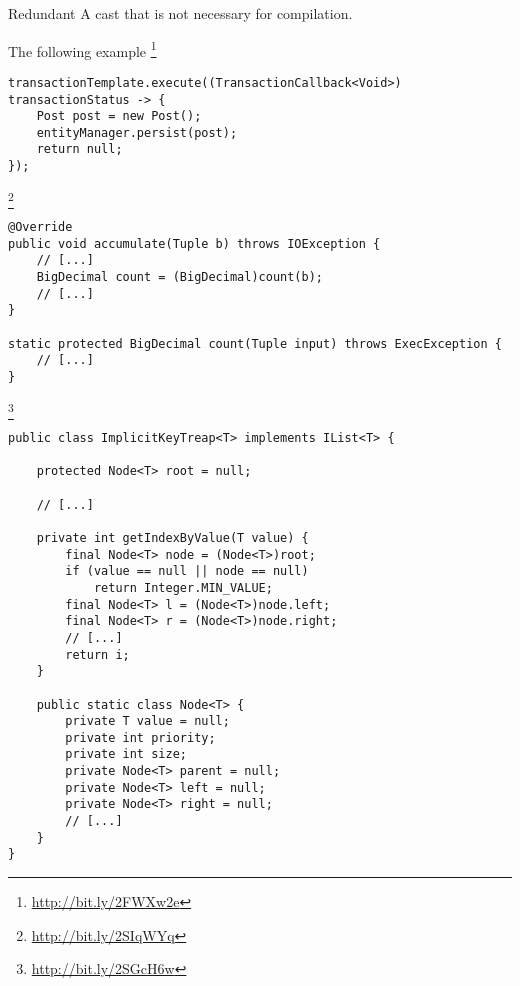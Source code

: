 \begin{pattern}{Redundant}
A cast that is not necessary for compilation.

\instances{}
The following example%
\footnote{\url{http://bit.ly/2FWXw2e}}

\begin{verbatim}
transactionTemplate.execute((TransactionCallback<Void>) transactionStatus -> {
    Post post = new Post();
    entityManager.persist(post);
    return null;
});
\end{verbatim}

\footnote{\url{http://bit.ly/2SIqWYq}}

\begin{verbatim}
@Override
public void accumulate(Tuple b) throws IOException {
    // [...]
    BigDecimal count = (BigDecimal)count(b);
    // [...]
}

static protected BigDecimal count(Tuple input) throws ExecException {
    // [...]
}
\end{verbatim}

\footnote{\url{http://bit.ly/2SGcH6w}}

\begin{verbatim}
public class ImplicitKeyTreap<T> implements IList<T> {

    protected Node<T> root = null;

    // [...]

    private int getIndexByValue(T value) {
        final Node<T> node = (Node<T>)root;
        if (value == null || node == null)
            return Integer.MIN_VALUE;
        final Node<T> l = (Node<T>)node.left;
        final Node<T> r = (Node<T>)node.right;
        // [...]
        return i;
    }

    public static class Node<T> {
        private T value = null;
        private int priority;
        private int size;
        private Node<T> parent = null;
        private Node<T> left = null;
        private Node<T> right = null;
        // [...]
    }
}
\end{verbatim}


\end{pattern}
